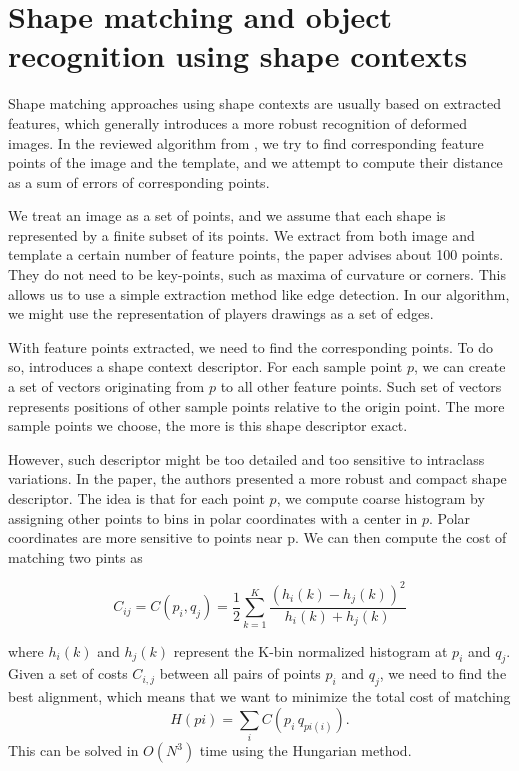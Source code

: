 \section{Shape matching and object recognition using shape contexts}
Shape matching approaches using shape contexts are usually based on extracted features, which generally introduces a more robust recognition of deformed images. In the reviewed algorithm from \citet{simple}, we try to find corresponding feature points of the image and the template, and we attempt to compute their distance as a sum of errors of corresponding points.

We treat an image as a set of points, and we assume that each shape is represented by a finite subset of its points. We extract from both image and template a certain number of feature points, the paper advises about 100 points. They do not need to be key-points, such as maxima of curvature or corners. This allows us to use a simple extraction method like edge detection. In our algorithm, we might use the representation of players drawings as a set of edges. 

With feature points extracted, we need to find the corresponding points. To do so, \citet{simple} introduces a shape context descriptor. For each sample point $p$, we can create a set of vectors originating from $p$ to all other feature points. Such set of vectors represents positions of other sample points relative to the origin point. The more sample points we choose, the more is this shape descriptor exact.

However, such descriptor might be too detailed and too sensitive to intraclass variations. In the paper, the authors presented a more robust and compact shape descriptor. The idea is that for each point $p$, we compute coarse histogram by assigning other points to bins in polar coordinates with a center in $p$. Polar coordinates are more sensitive to points near p. We can then compute the cost of matching two pints as 

\begin{equation*}
C_{ij} =  C(p_{i},q_{j}) = \frac{1}{2} \sum_{k=1}^{K} \frac{(h_{i}(k) - h_{j}(k))^2}{h_{i}(k) + h_{j}(k)}
\end{equation*}

where $ h_{i}(k) $ and $ h_{j}(k) $ represent the K-bin normalized histogram at $p_{i}$ and $q_{j}$. Given a set of costs $C_{i,j}$ between all pairs of points $p_{i}$ and $q_{j}$, we need to find the best alignment, which means that we want to minimize the total cost of matching 
\begin{equation*}
H(pi) = \sum_{i} C(p_{i}\,q_{pi(i)}).
\end{equation*}
This can be solved in $O(N^3)$ time using the Hungarian method\cite{simple}. 

